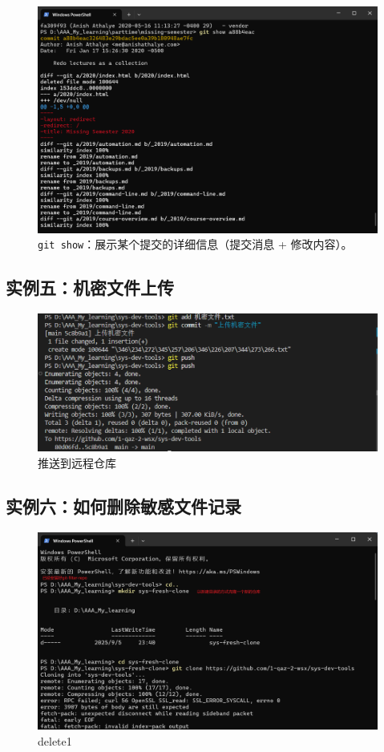 \documentclass[a4paper]{article}
\begin{document}
    \begin{figure}[H]
    \centering
    \includegraphics[width=1\textwidth]{images/show.png}
    \caption{\texttt{git show}：展示某个提交的详细信息（提交消息 + 修改内容）。}
    \end{figure}

\subsection{实例五：机密文件上传}
    \begin{figure}[H]
    \centering
    \includegraphics[width=1\textwidth]{images/addSecret.png}
    \caption{推送到远程仓库}
    \end{figure}
\subsection{实例六：如何删除敏感文件记录}
    \begin{figure}[H]
    \centering
    \includegraphics[width=1\textwidth]{images/delete1.png}
    \caption{delete1}
    \end{figure}
    \vspace{1cm}
\end{document}
